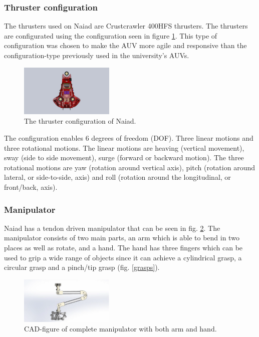 \documentclass[twoside,12pt]{article}
\begin{document}
\begin{multicols*}{2}
\subsubsection{Thruster configuration}
The thrusters used on Naiad are Crustcrawler 400HFS thrusters. The thrusters are configurated using the configuration seen in figure \ref{thrusterconfig}. This type of configuration was chosen to make the AUV more agile and responsive than the configuration-type previously used in the university's AUVs. 
\begin{figure}[H]
\begin{center}
\includegraphics[width=0.4\textwidth]{./images/thcon.png}
\caption{The thruster configuration of Naiad.}
\label{thrusterconfig}
\end{center}
\end{figure}
The configuration enables 6 degrees of freedom (DOF). Three linear motions and three rotational motions. The linear motions are heaving (vertical movement), sway (side to side movement), surge (forward or backward motion). The three rotational motions are yaw (rotation around vertical axis), pitch (rotation around lateral, or side-to-side, axis) and roll (rotation around the longitudinal, or front/back, axis).

\subsubsection{Manipulator}
Naiad has a tendon driven manipulator that can be seen in fig. \ref{mani1}. The manipulator consists of two main parts, an arm which is able to bend in two places as well as rotate, and a hand. The hand has three fingers which can be used to grip a wide range of objects since it can achieve a cylindrical grasp, a circular grasp and a pinch/tip grasp (fig. \ref{grasps}). 
\begin{figure}[H]
\begin{center}
\includegraphics[width=0.4\textwidth]{./images/mani1.png}
\caption{CAD-figure of complete manipulator with both arm and hand.}
\label{mani1}
\end{center}
\end{figure}


\end{multicols*}
\end{document}
